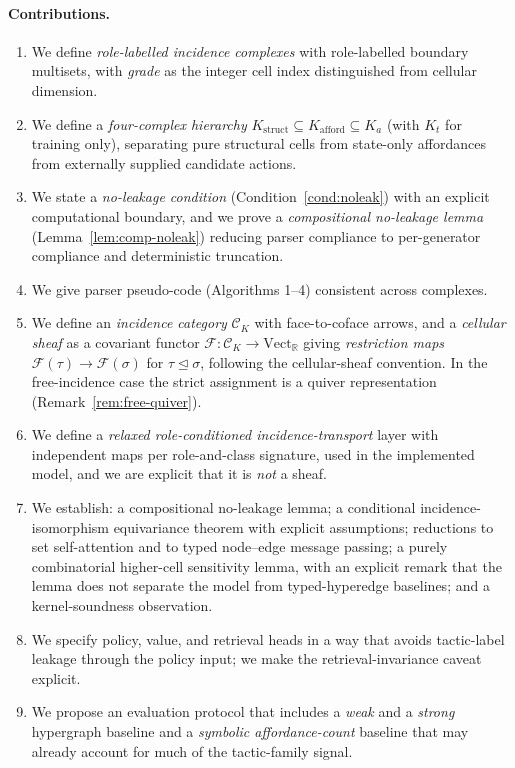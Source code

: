 \documentclass[11pt]{article}
\theoremstyle{definition}
\theoremstyle{plain}
\newcommand{\R}{\mathbb{R}}
\newcommand{\Vect}{\mathrm{Vect}}
\newcommand{\Kstruct}{K_{\mathrm{struct}}}
\newcommand{\Kafford}{K_{\mathrm{afford}}}
\newcommand{\catK}{\mathcal{C}_K}
\begin{document}
\paragraph{Contributions.}
\begin{enumerate}
\item We define \emph{role-labelled incidence complexes} with role-labelled boundary multisets, with \emph{grade} as the integer cell index distinguished from cellular dimension.
\item We define a \emph{four-complex hierarchy} $\Kstruct \subseteq \Kafford \subseteq K_a$ (with $K_t$ for training only), separating pure structural cells from state-only affordances from externally supplied candidate actions.
\item We state a \emph{no-leakage condition} (Condition~\ref{cond:noleak}) with an explicit computational boundary, and we prove a \emph{compositional no-leakage lemma} (Lemma~\ref{lem:comp-noleak}) reducing parser compliance to per-generator compliance and deterministic truncation.
\item We give parser pseudo-code (Algorithms 1--4) consistent across complexes.
\item We define an \emph{incidence category} $\catK$ with face-to-coface arrows, and a \emph{cellular sheaf} as a covariant functor $\mathcal{F}\colon \catK \to \Vect_{\R}$ giving \emph{restriction maps} $\mathcal{F}(\tau) \to \mathcal{F}(\sigma)$ for $\tau \trianglelefteq \sigma$, following the cellular-sheaf convention. In the free-incidence case the strict assignment is a quiver representation (Remark~\ref{rem:free-quiver}).
\item We define a \emph{relaxed role-conditioned incidence-transport} layer with independent maps per role-and-class signature, used in the implemented model, and we are explicit that it is \emph{not} a sheaf.
\item We establish: a compositional no-leakage lemma; a conditional incidence-isomorphism equivariance theorem with explicit assumptions; reductions to set self-attention and to typed node--edge message passing; a purely combinatorial higher-cell sensitivity lemma, with an explicit remark that the lemma does not separate the model from typed-hyperedge baselines; and a kernel-soundness observation.
\item We specify policy, value, and retrieval heads in a way that avoids tactic-label leakage through the policy input; we make the retrieval-invariance caveat explicit.
\item We propose an evaluation protocol that includes a \emph{weak} and a \emph{strong} hypergraph baseline and a \emph{symbolic affordance-count} baseline that may already account for much of the tactic-family signal.

\end{enumerate}
\end{document}
